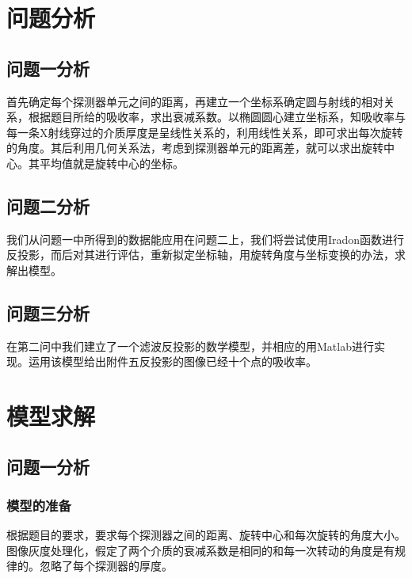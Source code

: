 \documentclass[withoutpreface,bwprint]{cumcmthesis} %
\begin{document}
\section{问题分析}

\subsection{问题一分析}

首先确定每个探测器单元之间的距离，再建立一个坐标系确定圆与射线的相对关系，根据题目所给的吸收率，求出衰减系数。以椭圆圆心建立坐标系，知吸收率与每一条X射线穿过的介质厚度是呈线性关系的，利用线性关系，即可求出每次旋转的角度。其后利用几何关系法，考虑到探测器单元的距离差，就可以求出旋转中心。其平均值就是旋转中心的坐标。
\subsection{问题二分析}
我们从问题一中所得到的数据能应用在问题二上，我们将尝试使用Iradon函数进行反投影，而后对其进行评估，重新拟定坐标轴，用旋转角度与坐标变换的办法，求解出模型。
\subsection{问题三分析}
在第二问中我们建立了一个滤波反投影的数学模型，并相应的用Matlab进行实现。运用该模型给出附件五反投影的图像已经十个点的吸收率。

\section{模型求解}
\subsection{问题一分析}
\subsubsection{模型的准备}
根据题目的要求，要求每个探测器之间的距离、旋转中心和每次旋转的角度大小。图像灰度处理化，假定了两个介质的衰减系数是相同的和每一次转动的角度是有规律的。忽略了每个探测器的厚度。
\end{document}
